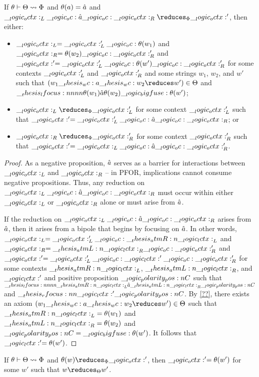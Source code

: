 \begin{theorem}[Soundness]
  If $\theta \vdash \Theta \rightsquigarrow \Phi$ and $\theta(a) = \hat{a}$ and $\octx_L \oc \defp{a} \oc \octx_R \reduces_{\orsig} \octx'$, then either:
  \begin{itemize}
  \item $\__logic_octx:_L = \__logic_octx:'_L \__logic_oc: \theta(w_1)$ and $\__logic_octx:_R = \theta(w_2) \__logic_oc: \__logic_octx:'_R$ and $\__logic_octx:' = \__logic_octx:'_L \__logic_oc: \theta(w') \__logic_oc: \__logic_octx:'_R$ for some contexts $\__logic_octx:'_L$ and $\__logic_octx:'_R$ and some strings $w_1$, $w_2$, and $w'$ such that $(w_1 \wc a \wc w_2 \reduces w') \in \srsig$ and $\__thesis_lfocus:nnnn {\theta(w_1)} {\hat{a}} {\theta(w_2)} {\__logic_bigfuse: \theta(w')}$;
  \item $\octx_L \reduces_{\orsig} \octx'_L$ for some context $\__logic_octx:'_L$ such that $\__logic_octx:' = \__logic_octx:'_L \__logic_oc: \hat{a} \__logic_oc: \__logic_octx:_R$; or
  \item $\octx_R \reduces_{\orsig} \octx'_R$ for some context $\__logic_octx:'_R$ such that $\__logic_octx:' = \__logic_octx:_L \__logic_oc: \hat{a} \__logic_oc: \__logic_octx:'_R$.
  \end{itemize}
\end{theorem}
\begin{proof}
  As a negative proposition, $\hat{a}$ serves as a barrier for interactions between $\__logic_octx:_L$ and $\__logic_octx:_R$ -- in \ac{PFOR}, implications cannot consume negative propositions.
  Thus, any reduction on $\__logic_octx:_L \__logic_oc: \hat{a} \__logic_oc: \__logic_octx:_R$ must occur within either $\__logic_octx:_L$ or $\__logic_octx:_R$ alone or must arise from $\hat{a}$.

  If the reduction on $\__logic_octx:_L \__logic_oc: \hat{a} \__logic_oc: \__logic_octx:_R$ arises from $\hat{a}$, then it arises from a bipole that begins by focusing on $\hat{a}$.
  In other words, $\__logic_octx:_L = \__logic_octx:'_L \__logic_oc: \__thesis_atmR:n {\__logic_lctx:}_L$ and $\__logic_octx:_R = \__thesis_atmL:n {\__logic_lctx:}_R \__logic_oc: \__logic_octx:'_R$ and $\__logic_octx:' = \__logic_octx:'_L \__logic_oc: \__logic_lctx:' \__logic_oc: \__logic_octx:'_R$ for some contexts $\__thesis_atmR:n {\__logic_lctx:}_L$, $\__thesis_atmL:n {\__logic_lctx:}_R$, and $\__logic_lctx:'$ and positive proposition $\__logic_polarity_pos:n {C}$ such that $\__thesis_lfocus:nnnn {\__thesis_atmR:n {\__logic_lctx:}_L} {\hat{a}} {\__thesis_atmL:n {\__logic_lctx:}_R} {\__logic_polarity_pos:n {C}}$ and $\__thesis_rfocus:nn {\__logic_lctx:'} {\__logic_polarity_pos:n {C}}$.
  By \cref{??}, there exists an axiom $(w_1 \wc a \wc w_2 \reduces w') \in \srsig$ such that $\__thesis_atmR:n {\__logic_lctx:}_L = \theta(w_1)$ and $\__thesis_atmL:n {\__logic_lctx:}_R = \theta(w_2)$ and $\__logic_polarity_pos:n {C} = \__logic_bigfuse: \theta(w')$.
  It follows that $\__logic_lctx:' = \theta(w')$.
\end{proof}

\begin{corollary}[Soundness]
  If $\theta \vdash \Theta \rightsquigarrow \Phi$ and $\theta(w) \reduces_{\orsig} \octx'$, then $\__logic_octx:' = \theta(w')$ for some $w'$ such that $w \reduces_{\srsig} w'$.
\end{corollary}

